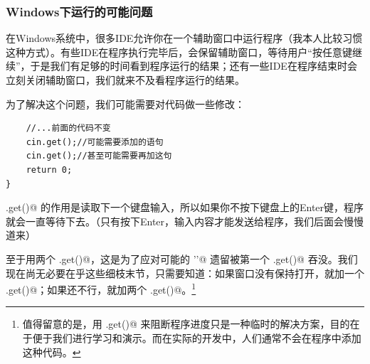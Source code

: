 \subsubsection*{Windows下运行的可能问题}
在Windows系统中，很多IDE允许你在一个辅助窗口中运行程序（我本人比较习惯这种方式）。有些IDE在程序执行完毕后，会保留辅助窗口，等待用户``按任意键继续''，于是我们有足够的时间看到程序运行的结果；还有一些IDE在程序结束时会立刻关闭辅助窗口，我们就来不及看程序运行的结果。\par
为了解决这个问题，我们可能需要对代码做一些修改：
\begin{lstlisting}
    //...前面的代码不变
    cin.get();//可能需要添加的语句
    cin.get();//甚至可能需要再加这句
    return 0;
}
\end{lstlisting}
\lstinline@cin.get()@ 的作用是读取下一个键盘输入，所以如果你不按下键盘上的Enter键，程序就会一直等待下去。（只有按下Enter，输入内容才能发送给程序，我们后面会慢慢道来）\par
至于用两个 \lstinline@cin.get()@，这是为了应对可能的 \lstinline@'\n'@ 遗留被第一个 \lstinline@cin.get()@ 吞没。我们现在尚无必要在乎这些细枝末节，只需要知道：如果窗口没有保持打开，就加一个 \lstinline@cin.get()@；如果还不行，就加两个 \lstinline@cin.get()@。\footnote{值得留意的是，用 \lstinline@cin.get()@ 来阻断程序进度只是一种临时的解决方案，目的在于便于我们进行学习和演示。而在实际的开发中，人们通常不会在程序中添加这种代码。}\par
